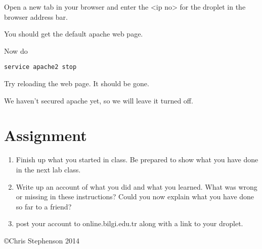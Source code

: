 \documentclass[12pt, a4paper]{article}
\begin{document}
Open a new tab in your browser and enter the <ip no> for the droplet in the browser address bar.

You should get the default apache web page.

Now do

\begin{verbatim}
service apache2 stop
\end{verbatim}

Try reloading the web page. It should be gone.

We haven’t secured apache yet, so we will leave it turned off.


\section*{Assignment}


\begin{enumerate}
\item Finish up what you started in class. Be prepared to show what you have done in the next lab class. 
\item Write up an account of what you did and what you learned. What was wrong or missing in these instructions? Could you now explain what you have done so far to a friend?
\item post your account to online.bilgi.edu.tr along with a link to your droplet.

\end{enumerate}

\copyright Chris Stephenson 2014
\end{document}
